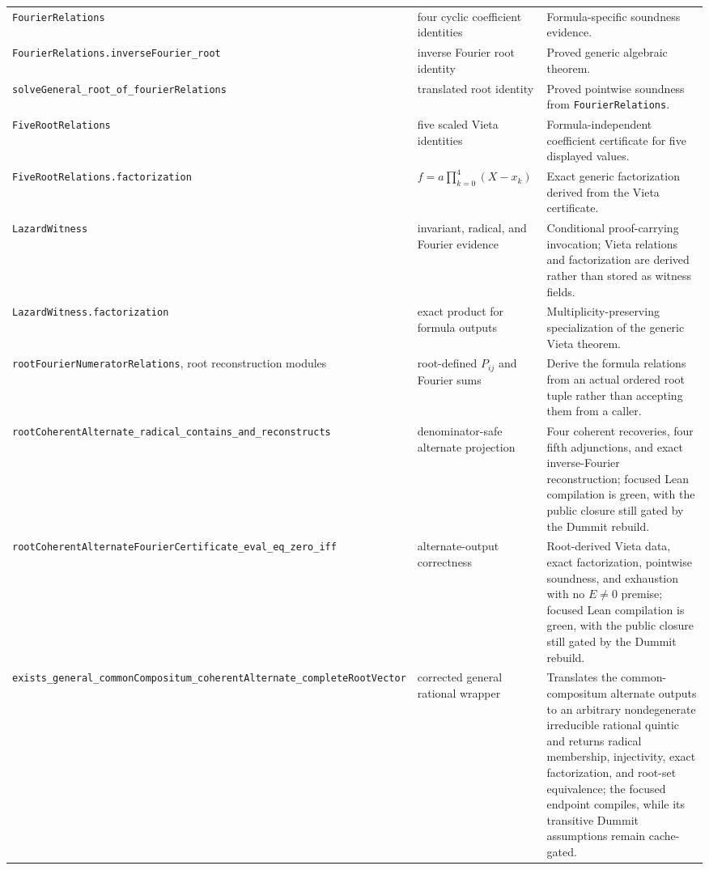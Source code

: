 \documentclass[11pt,a4paper,oneside]{article}
\newcommand{\lean}[1]{\nolinkurl{#1}}
\begin{document}
\begin{longtable}{>{\raggedright\arraybackslash}p{}
                  >{\raggedright\arraybackslash}p{}
                  >{\raggedright\arraybackslash}p{}}
\lean{FourierRelations} & four cyclic coefficient identities & Formula-specific soundness evidence.\\
\lean{FourierRelations.inverseFourier_root} & inverse Fourier root identity & Proved generic algebraic theorem.\\
\lean{solveGeneral_root_of_fourierRelations} & translated root identity & Proved pointwise soundness from \lean{FourierRelations}.\\
\lean{FiveRootRelations} & five scaled Vieta identities & Formula-independent coefficient certificate for five displayed values.\\
\lean{FiveRootRelations.factorization} & $f=a\prod_{k=0}^4(X-x_k)$ & Exact generic factorization derived from the Vieta certificate.\\
\lean{LazardWitness} & invariant, radical, and Fourier evidence & Conditional proof-carrying invocation; Vieta relations and factorization are derived rather than stored as witness fields.\\
\lean{LazardWitness.factorization} & exact product for formula outputs & Multiplicity-preserving specialization of the generic Vieta theorem.\\
\lean{rootFourierNumeratorRelations}, root reconstruction modules & root-defined $P_{ij}$ and Fourier sums & Derive the formula relations from an actual ordered root tuple rather than accepting them from a caller.\\
\lean{rootCoherentAlternate_radical_contains_and_reconstructs} & denominator-safe alternate projection & Four coherent recoveries, four fifth adjunctions, and exact inverse-Fourier reconstruction; focused Lean compilation is green, with the public closure still gated by the Dummit rebuild.\\
\lean{rootCoherentAlternateFourierCertificate_eval_eq_zero_iff} & alternate-output correctness & Root-derived Vieta data, exact factorization, pointwise soundness, and exhaustion with no $E\ne0$ premise; focused Lean compilation is green, with the public closure still gated by the Dummit rebuild.\\
\lean{exists_general_commonCompositum_coherentAlternate_completeRootVector} & corrected general rational wrapper & Translates the common-compositum alternate outputs to an arbitrary nondegenerate irreducible rational quintic and returns radical membership, injectivity, exact factorization, and root-set equivalence; the focused endpoint compiles, while its transitive Dummit assumptions remain cache-gated.\\

\end{longtable}
\end{document}
